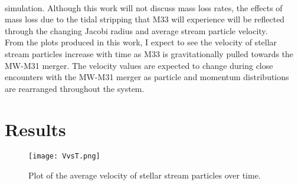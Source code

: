 \documentclass[preprint2]{aastex7}
\begin{document}
\newline\\
simulation. Although this work will not discuss mass loss rates, the effects of mass loss due to the tidal stripping that M33 will experience will be reflected through the changing Jacobi radius and average stream particle velocity.\\
From the plots produced in this work, I expect to see the velocity of stellar stream particles increase with time as M33 is gravitationally pulled towards the MW-M31 merger. The velocity values are expected to change during close encounters with the MW-M31 merger as particle and momentum distributions are rearranged throughout the system.\\

\section{Results}
\begin{figure}[h!]
\centering
    \texttt{[image: VvsT.png]}
    \label{fig:enter-label}
    \caption{Plot of the average velocity of stellar stream particles over time.}
\end{figure}


\pagebreak\\

{}

\end{document}
